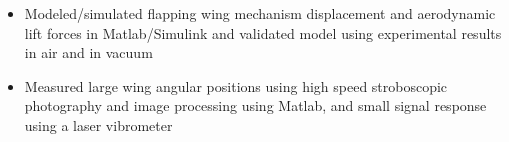 	\begin{itemize}[leftmargin = \itemmargin]
	\item Modeled/simulated flapping wing mechanism displacement and aerodynamic lift forces in Matlab/Simulink and validated model using experimental results in air and in vacuum
	\item Measured large wing angular positions using high speed stroboscopic photography and image processing using Matlab, and small signal response using a laser vibrometer
	\end{itemize} 